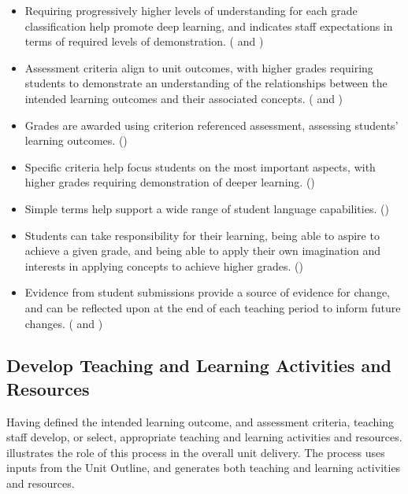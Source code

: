 \begin{itemize}[noitemsep,nolistsep]
	\item Requiring progressively higher levels of understanding for each grade classification help promote deep learning, and indicates staff expectations in terms of required levels of demonstration. ( and )
	\item Assessment criteria align to unit outcomes, with higher grades requiring students to demonstrate an understanding of the relationships between the intended learning outcomes and their associated concepts. ( and )
	\item Grades are awarded using criterion referenced assessment, assessing students' learning outcomes. ()
	\item Specific criteria help focus students on the most important aspects, with higher grades requiring demonstration of deeper learning. ()
	\item Simple terms help support a wide range of student language capabilities. ()
	\item Students can take responsibility for their learning, being able to aspire to achieve a given grade, and being able to apply their own imagination and interests in applying concepts to achieve higher grades. ()
	\item Evidence from student submissions provide a source of evidence for change, and can be reflected upon at the end of each teaching period to inform future changes. ( and )
\end{itemize}




\clearpage
\subsection{Develop Teaching and Learning Activities and Resources} %
\label{ssub:develop_teaching_and_learning_activities_and_resources}

Having defined the intended learning outcome, and assessment criteria, teaching staff develop, or select, appropriate teaching and learning activities and resources.  illustrates the role of this process in the overall unit delivery. The process uses inputs from the Unit Outline, and generates both teaching and learning activities and resources.

